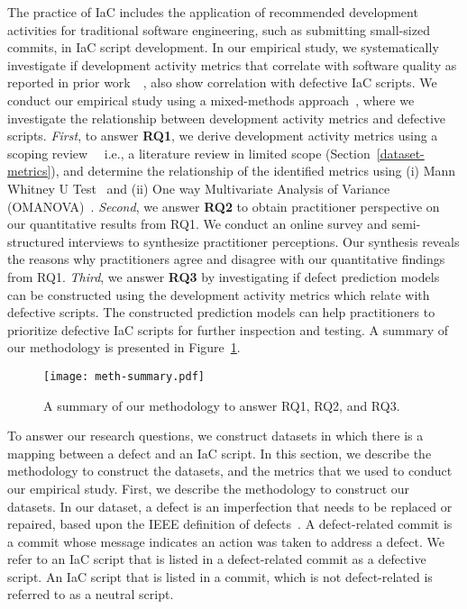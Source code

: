 \documentclass[smallextended]{svjour3}       %
\begin{document}
The practice of IaC includes the application of recommended development activities for traditional software engineering, such as submitting small-sized commits, in IaC script development. In our empirical study, we systematically investigate if development activity metrics that correlate with software quality as reported in prior work~\citep{Meneely:Linus}~\citep{Bird:Minor}, also show correlation with defective IaC scripts. We conduct our empirical study using a mixed-methods approach~\citep{storey:mixed:meth}, where we investigate the relationship between development activity metrics and defective scripts. \textit{First}, to answer \textbf{RQ1}, we derive development activity metrics using a scoping review~\citep{anderson2008:scoping}~\citep{scoping:original} i.e., a literature review in limited scope (Section~\ref{dataset-metrics}), and determine the relationship of the identified metrics using (i) Mann Whitney U Test~\citep{mann:whitney:original} and (ii) One way Multivariate Analysis of Variance (OMANOVA)~\citep{manova:book:huberty}. \textit{Second}, we answer \textbf{RQ2} to obtain practitioner perspective on our quantitative results from RQ1. We conduct an online survey and semi-structured interviews to synthesize practitioner perceptions. Our synthesis reveals the reasons why practitioners agree and disagree with our quantitative findings from RQ1. \textit{Third}, we answer \textbf{RQ3} by investigating if defect prediction models can be constructed using the development activity metrics which relate with defective scripts. The constructed prediction models can help practitioners to prioritize defective IaC scripts for further inspection and testing. A summary of our methodology is presented in Figure~\ref{fig-meth-summary}. 

\begin{figure}[t]
\centering
\texttt{[image: meth-summary.pdf]}
\caption{A summary of our methodology to answer RQ1, RQ2, and RQ3. }
\label{fig-meth-summary}
\end{figure}  

To answer our research questions, we construct datasets in which there is a mapping between a defect and an IaC script. In this section, we describe the methodology to construct the datasets, and the metrics that we used to conduct our empirical study. First, we describe the methodology to construct our datasets. In our dataset, a defect is an imperfection that needs to be replaced or repaired, based upon the IEEE definition of defects~\citep{ieee:def}. A defect-related commit is a commit whose message indicates an action was taken to address a defect. We refer to an IaC script that is listed in a defect-related commit as a defective script. An IaC script that is listed in a commit, which is not defect-related is referred to as a neutral script. 
\end{document}
